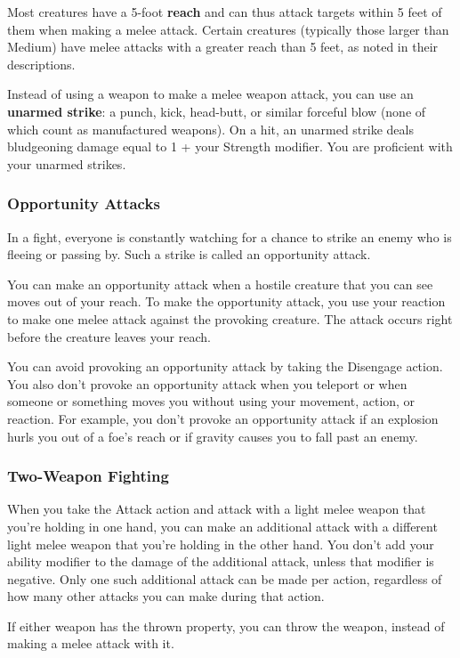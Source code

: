 Most creatures have a 5-foot \textbf{reach} and can thus attack targets within 5 feet of them when making a melee attack. Certain creatures (typically those larger than Medium) have melee attacks with a greater reach than 5 feet, as noted in their descriptions.

Instead of using a weapon to make a melee weapon attack, you can use an \textbf{unarmed strike}: a punch, kick, head-butt, or similar forceful blow (none of which count as manufactured weapons). On a hit, an unarmed strike deals bludgeoning damage equal to 1 + your Strength modifier. You are proficient with your unarmed strikes.

\subsubsection{Opportunity Attacks}

In a fight, everyone is constantly watching for a chance to strike an enemy who is fleeing or passing by. Such a strike is called an opportunity attack.

You can make an opportunity attack when a hostile creature that you can see moves out of your reach. To make the opportunity attack, you use your reaction to make one melee attack against the provoking creature. The attack occurs right before the creature leaves your reach.

You can avoid provoking an opportunity attack by taking the Disengage action. You also don't provoke an opportunity attack when you teleport or when someone or something moves you without using your movement, action, or reaction. For example, you don't provoke an opportunity attack if an explosion hurls you out of a foe's reach or if gravity causes you to fall past an enemy.

\subsubsection{Two-Weapon Fighting}

When you take the Attack action and attack with a light melee weapon that you're holding in one hand, you can make an additional attack with a different light melee weapon that you're holding in the other hand. You don't add your ability modifier to the damage of the additional attack, unless that modifier is negative. Only one such additional attack can be made per action, regardless of how many other attacks you can make during that action.

If either weapon has the thrown property, you can throw the weapon, instead of making a melee attack with it.

